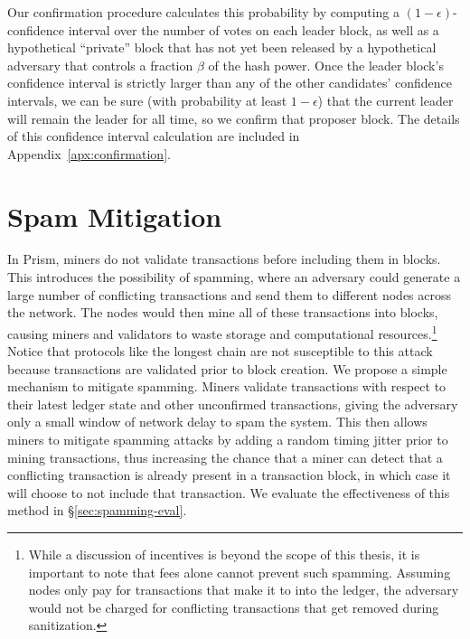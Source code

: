 Our confirmation procedure calculates this probability by computing a $(1-\epsilon)$-confidence interval over the number of votes on each leader block, as well as a hypothetical ``private'' block that has not yet been released by a hypothetical adversary that controls a fraction $\beta$ of the hash power. 
Once the leader block's confidence interval is strictly larger than any of the other candidates' confidence intervals, we can be sure (with probability at least $1-\epsilon$) that the current leader will remain the leader for all time, so we confirm that proposer block. 
The details of this confidence interval calculation are included in Appendix~\ref{apx:confirmation}.

\section{Spam Mitigation}
\label{sec:spamming-design}

In Prism, miners do not validate transactions before including them in blocks.
This introduces the possibility of spamming, where an adversary could generate a large number of conflicting transactions and send them to different nodes across the network.  
The nodes would then mine all of these transactions into blocks, causing miners and validators to waste storage  and computational  resources.\footnote{While a discussion of incentives is beyond the scope of this thesis, it is important to note that fees alone cannot prevent such spamming. Assuming nodes only pay for transactions that make it to into the ledger, the adversary would not be charged for conflicting transactions that get removed during sanitization.}
Notice that protocols like the longest chain are not susceptible to this attack because transactions are validated prior to block creation. 
We propose a simple mechanism to mitigate spamming. Miners validate transactions with respect to their latest ledger state and other unconfirmed transactions, giving the adversary only a small window of network delay to spam the system. 
This then allows miners to mitigate spamming attacks by adding a random timing jitter prior to mining transactions, thus increasing the chance that a miner can detect that a conflicting transaction is already present in a transaction block, in  which case it will choose to not include that transaction.
We evaluate the effectiveness of this method in \S\ref{sec:spamming-eval}.



